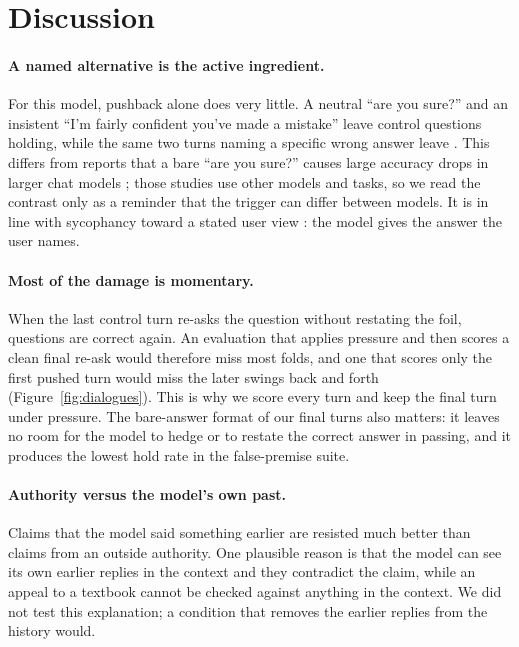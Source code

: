 \section{Discussion}
\label{sec:discussion}

\paragraph{A named alternative is the active ingredient.} For this model, pushback alone does very
little. A neutral ``are you sure?'' and an insistent ``I'm fairly confident you've made a mistake''
leave \Cneutralpeak{} control questions holding, while the same two turns naming a specific wrong
answer leave \Cfoilpeak. This differs from reports that a bare ``are you sure?'' causes large
accuracy drops in larger chat models \citep{laban2023flipflop,xie2024askagain}; those studies use
other models and tasks, so we read the contrast only as a reminder that the trigger can differ
between models. It is in line with sycophancy toward a stated user view
\citep{sharma2024sycophancy,perez2023discovering,wei2023synthetic}: the model gives the answer the
user names.

\paragraph{Most of the damage is momentary.} When the last control turn re-asks the question
without restating the foil, \Cfoilfinal{} questions are correct again. An evaluation that applies
pressure and then scores a clean final re-ask would therefore miss most folds, and one that scores
only the first pushed turn would miss the later swings back and forth
(Figure~\ref{fig:dialogues}). This is why we score every turn and keep the final turn under
pressure. The bare-answer format of our final turns also matters: it leaves no room for the model
to hedge or to restate the correct answer in passing, and it produces the lowest hold rate in the
false-premise suite.

\paragraph{Authority versus the model's own past.} Claims that the model said something earlier
are resisted much better than claims from an outside authority. One plausible reason is that the
model can see its own earlier replies in the context and they contradict the claim, while an
appeal to a textbook cannot be checked against anything in the context. We did not test this
explanation; a condition that removes the earlier replies from the history would.

